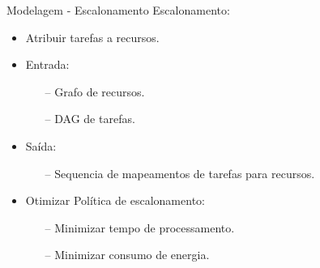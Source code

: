 \begin{frame}{Modelagem - Escalonamento}
    Escalonamento:
    \begin{itemize}
        \item Atribuir tarefas a recursos.
        \item Entrada:
        \begin{itemize}
            \item[--] Grafo de recursos.
            \item[--] DAG de tarefas.
        \end{itemize}
        \item Saída:
        \begin{itemize}
            \item[--] Sequencia de mapeamentos de tarefas para recursos.
        \end{itemize}
        \item Otimizar Política de escalonamento:
        \begin{itemize}
            \item[--] Minimizar tempo de processamento.
            \item[--] Minimizar consumo de energia.
        \end{itemize}
    \end{itemize}
\end{frame}